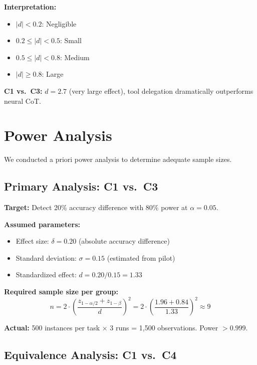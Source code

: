 \documentclass{article}
\theoremstyle{plain}
\theoremstyle{definition}
\theoremstyle{remark}
\begin{document}
\textbf{Interpretation:}
\begin{itemize}
\item $|d| < 0.2$: Negligible
\item $0.2 \leq |d| < 0.5$: Small
\item $0.5 \leq |d| < 0.8$: Medium
\item $|d| \geq 0.8$: Large
\end{itemize}

\textbf{C1 vs.\ C3:} $d = 2.7$ (very large effect), tool delegation dramatically outperforms neural CoT.


\section{Power Analysis}
\label{app:power}

We conducted a priori power analysis to determine adequate sample sizes.

\subsection{Primary Analysis: C1 vs.\ C3}

\textbf{Target:} Detect 20\% accuracy difference with 80\% power at $\alpha = 0.05$.

\textbf{Assumed parameters:}
\begin{itemize}
\item Effect size: $\delta = 0.20$ (absolute accuracy difference)
\item Standard deviation: $\sigma = 0.15$ (estimated from pilot)
\item Standardized effect: $d = 0.20/0.15 = 1.33$
\end{itemize}

\textbf{Required sample size per group:}
\begin{equation}
n = 2 \cdot \left(\frac{z_{1-\alpha/2} + z_{1-\beta}}{d}\right)^2 = 2 \cdot \left(\frac{1.96 + 0.84}{1.33}\right)^2 \approx 9
\end{equation}

\textbf{Actual:} 500 instances per task $\times$ 3 runs = 1,500 observations. Power $> 0.999$.

\subsection{Equivalence Analysis: C1 vs.\ C4}
\end{document}
